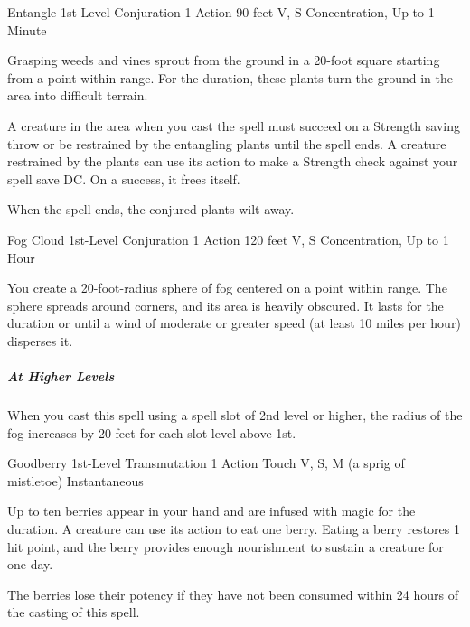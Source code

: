 \documentclass[letterpaper,openany,oneside,twocolumn]{book}
\begin{document}
\DndSpellHeader
  {Entangle}
  {1st-Level Conjuration}
  {1 Action}
  {90 feet}
  {V, S}
  {Concentration, Up to 1 Minute}

Grasping weeds and vines sprout from the ground in a 20-foot square starting from a point within range. For the duration, these plants turn the ground in the area into difficult terrain.

A creature in the area when you cast the spell must succeed on a Strength saving throw or be restrained by the entangling plants until the spell ends. A creature restrained by the plants can use its action to make a Strength check against your spell save DC. On a success, it frees itself.

When the spell ends, the conjured plants wilt away.

\DndSpellHeader
  {Fog Cloud}
  {1st-Level Conjuration}
  {1 Action}
  {120 feet}
  {V, S}
  {Concentration, Up to 1 Hour}

You create a 20-foot-radius sphere of fog centered on a point within range. The sphere spreads around corners, and its area is heavily obscured. It lasts for the duration or until a wind of moderate or greater speed (at least 10 miles per hour) disperses it.

\subparagraph*{At Higher Levels} When you cast this spell using a spell slot of 2nd level or higher, the radius of the fog increases by 20 feet for each slot level above 1st.

\DndSpellHeader
  {Goodberry}
  {1st-Level Transmutation}
  {1 Action}
  {Touch}
  {V, S, M (a sprig of mistletoe)}
  {Instantaneous}

Up to ten berries appear in your hand and are infused with magic for the duration. A creature can use its action to eat one berry. Eating a berry restores 1 hit point, and the berry provides enough nourishment to sustain a creature for one day.

The berries lose their potency if they have not been consumed within 24 hours of the casting of this spell.
\end{document}

